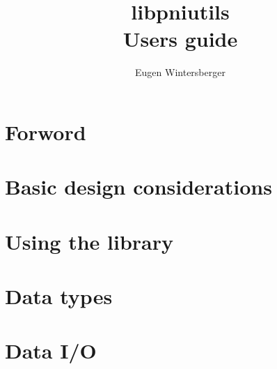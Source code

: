 \documentclass[a4paper,twoside]{book}
\author{Eugen Wintersberger}
\title{{\Huge libpniutils\\ Users guide}}
\begin{document}
\maketitle
\tableofcontents

\chapter{Forword}

\chapter{Basic design considerations}


\chapter{Using the library}

\chapter{Data types}

\chapter{Data I/O}
\end{document}
